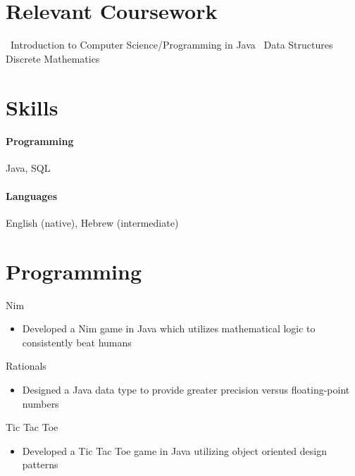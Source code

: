 \documentclass[10pt]{article}
\begin{document}
\vfill
\section*{Relevant Coursework}
\textbullet \, Introduction to Computer Science/Programming in Java
\hfill
\textbullet \, Data Structures
\hfill
\textbullet \, Discrete Mathematics


\vfill
\section*{Skills}

\paragraph*{Programming}
Java, SQL
\paragraph*{Languages}
English (native), Hebrew (intermediate)


\vfill
\section*{Programming}

Nim
\begin{itemize}
    \item Developed a Nim game in Java which utilizes mathematical logic to consistently beat humans
\end{itemize}

Rationals
\begin{itemize}
    \item Designed a Java data type to provide greater precision versus floating-point numbers
\end{itemize}

Tic Tac Toe
\begin{itemize}
    \item Developed a Tic Tac Toe game in Java utilizing object oriented design patterns
\end{itemize}
\end{document}
